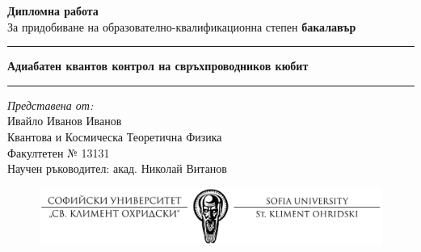 \documentclass[12pt]{report}
\author{}
\title{}
\date{}
\begin{document}
    \begin{titlepage}
        \begin{center}
            \vspace*{3.5cm}
            \Huge\textbf{Дипломна работа}\\
            \vspace{0.5cm}
            \Large
            За придобиване на образователно-квалификационна степен \textbf{бакалавър}\\
            \vspace{1cm}
            \hrule
            \vspace{0.45cm}
            \Huge
            \textbf{Адиабатен квантов контрол на свръхпроводников кюбит}\\
            \vspace{0.45cm}
            \hrule
            \vspace{3cm}
            \Large
            \textit{Представена от:}\\
            Ивайло Иванов  Иванов\\
            Квантова и Космическа Теоретична Физика\\
            Факултетен № 13131\\
            \vspace{0.3cm}
            Научен ръководител: акад. Николай Витанов\\
            \vspace{5cm}
            \begin{figure}[htp]
                \centering
                \includegraphics[width=330pt]{Untitled.png}
            \end{figure}

        \end{center}
    \end{titlepage}

        \large
        \tableofcontents
        \thispagestyle{empty}
        \newpage

    \clearpage
\end{document}
